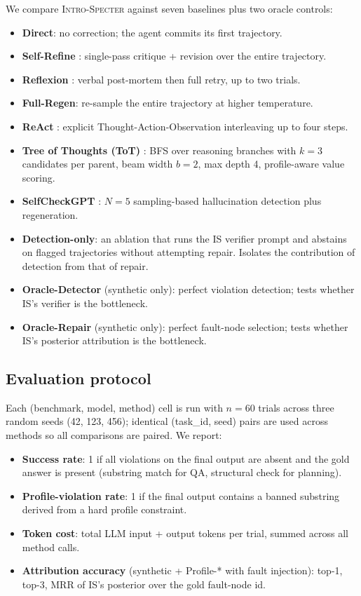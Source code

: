 We compare \textsc{Intro-Specter} against seven baselines plus
two oracle controls:
\begin{itemize}[leftmargin=*,itemsep=2pt,topsep=2pt]
\item \textbf{Direct}: no correction; the agent commits its first
trajectory.
\item \textbf{Self-Refine} \citep{madaan2023selfrefine}:
single-pass critique + revision over the entire trajectory.
\item \textbf{Reflexion} \citep{shinn2023reflexion}: verbal
post-mortem then full retry, up to two trials.
\item \textbf{Full-Regen}: re-sample the entire trajectory at
higher temperature.
\item \textbf{ReAct} \citep{yao2023react}: explicit
Thought-Action-Observation interleaving up to four steps.
\item \textbf{Tree of Thoughts (ToT)} \citep{yao2023tot}: BFS
over reasoning branches with $k=3$ candidates per parent, beam
width $b=2$, max depth 4, profile-aware value scoring.
\item \textbf{SelfCheckGPT} \citep{manakul2023selfcheckgpt}: $N=5$
sampling-based hallucination detection plus regeneration.
\item \textbf{Detection-only}: an ablation that runs the IS
verifier prompt and abstains on flagged trajectories without
attempting repair. Isolates the contribution of detection from
that of repair.
\item \textbf{Oracle-Detector} (synthetic only): perfect
violation detection; tests whether IS's verifier is the
bottleneck.
\item \textbf{Oracle-Repair} (synthetic only): perfect
fault-node selection; tests whether IS's posterior
attribution is the bottleneck.
\end{itemize}

\subsection{Evaluation protocol}

Each (benchmark, model, method) cell is run with $n=60$ trials
across three random seeds (42, 123, 456); identical (task\_id, seed)
pairs are used across methods so all comparisons are paired. We
report:
\begin{itemize}[leftmargin=*,itemsep=2pt,topsep=2pt]
\item \textbf{Success rate}: 1 if all violations on the final
output are absent and the gold answer is present (substring
match for QA, structural check for planning).
\item \textbf{Profile-violation rate}: 1 if the final output
contains a banned substring derived from a hard profile
constraint.
\item \textbf{Token cost}: total LLM input + output tokens per
trial, summed across all method calls.
\item \textbf{Attribution accuracy} (synthetic + Profile-* with
fault injection): top-1, top-3, MRR of IS's posterior over
the gold fault-node id.
\end{itemize}

